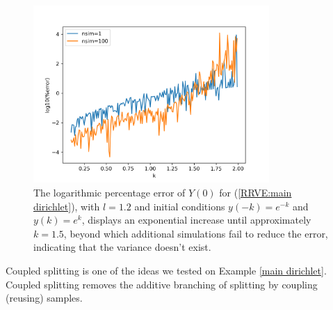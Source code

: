 \documentclass[a4paper,12pt]{article}
\begin{document}
\begin{figure}[h!]
    \centering
    \includegraphics[width=0.8\textwidth]{plots/mainD explosion.png}
    \caption{The logarithmic percentage error of $Y(0)$ for
    (\ref{RRVE:main dirichlet}), with $l=1.2$ and initial conditions
    $y(-k)=e^{-k}$ and $y(k)=e^{k}$, displays an exponential
    increase until approximately $k=1.5$, beyond which additional
    simulations fail to reduce the error, indicating that the variance
    doesn't exist.}
    \label{fig:mainD explosion}
\end{figure}

Coupled splitting is one of the ideas we tested on Example \ref{main dirichlet}.
Coupled splitting removes the additive branching of splitting by coupling (reusing)
samples.
\end{document}
